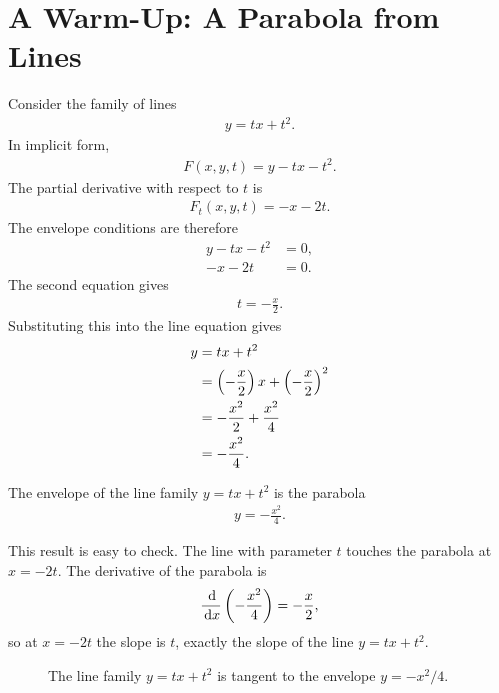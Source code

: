 \documentclass[11pt]{article}
\begin{document}
\section{A Warm-Up: A Parabola from Lines}

Consider the family of lines
\begin{align}
  y=tx+t^2.
\end{align}
In implicit form,
\begin{align}
  F(x,y,t)=y-tx-t^2.
\end{align}
The partial derivative with respect to \(t\) is
\begin{align}
  F_t(x,y,t)=-x-2t.
\end{align}
The envelope conditions are therefore
\begin{align}
  y-tx-t^2&=0,\\
  -x-2t&=0.
\end{align}
The second equation gives
\begin{align}
  t=-\frac{x}{2}.
\end{align}
Substituting this into the line equation gives
\begin{align}
  y
    &=tx+t^2\\
    &=\left( -\frac{x}{2} \right)x+\left( -\frac{x}{2} \right)^2\\
    &=-\frac{x^2}{2}+\frac{x^2}{4}\\
    &=-\frac{x^2}{4}.
\end{align}

\begin{resultbox}
The envelope of the line family \(y=tx+t^2\) is the parabola
\begin{align}
  \boxed{y=-\frac{x^2}{4}.}
  \label{eq:parabola-envelope}
\end{align}
\end{resultbox}

This result is easy to check. The line with parameter \(t\) touches the parabola at \(x=-2t\). The derivative of the parabola is
\begin{align}
  \frac{\,\mathrm{d}}{\,\mathrm{d} x}\left( -\frac{x^2}{4} \right)=-\frac{x}{2},
\end{align}
so at \(x=-2t\) the slope is \(t\), exactly the slope of the line \(y=tx+t^2\).

\begin{figure}[htbp]
  \centering
  \caption{The line family \(y=tx+t^2\) is tangent to the envelope \(y=-x^2/4\).}
  \label{fig:line-parabola-envelope}
\end{figure}
\end{document}
